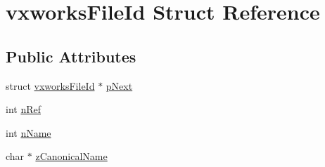 \hypertarget{structvxworks_file_id}{\section{vxworks\-File\-Id Struct Reference}
\label{structvxworks_file_id}
}
\subsection*{Public Attributes}
\begin{DoxyCompactItemize}
\item 
struct \hyperlink{structvxworks_file_id}{vxworks\-File\-Id} $\ast$ \hyperlink{structvxworks_file_id_a1941104384e7aa1ad9d8574d091abe3a}{p\-Next}
\item 
int \hyperlink{structvxworks_file_id_a59dde49ee027786a06de8ad59b1d7883}{n\-Ref}
\item 
int \hyperlink{structvxworks_file_id_af7ed9a749d73b74b534bc06baf1abf6d}{n\-Name}
\item 
char $\ast$ \hyperlink{structvxworks_file_id_a032c9aaaa13ff100d9f3cd53926587fe}{z\-Canonical\-Name}
\end{DoxyCompactItemize}


